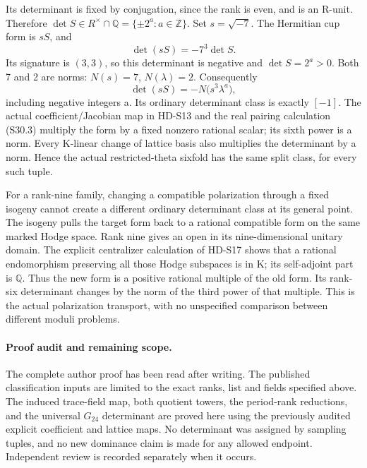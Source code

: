 Its determinant is fixed by conjugation, since the rank is even,
and is an R-unit. Therefore
\(\det S\in R^\times\cap\mathbb Q=\{\pm2^a:a\in\mathbb Z\}\).
Set \(s=\sqrt{-7}\). The Hermitian cup form is \(sS\), and
\[
                    \det(sS)=-7^3\det S.
\]
Its signature is \((3,3)\), so this determinant is negative
and \(\det S=2^a>0\). Both 7 and 2 are norms:
\(N(s)=7\), \(N(\lambda)=2\). Consequently
\[
              \det(sS)=-N\bigl(s^3\lambda^a\bigr),
\]
including negative integers a. Its ordinary determinant class
is exactly \([-1]\). The actual coefficient/Jacobian map in
HD-S13 and the real pairing calculation (S30.3) multiply the form
by a fixed nonzero rational scalar; its sixth power is a norm.
Every K-linear change of lattice basis also multiplies the
determinant by a norm. Hence the actual restricted-theta sixfold
has the same split class, for every such tuple.

For a rank-nine family, changing a compatible polarization through
a fixed isogeny cannot create a different ordinary determinant
class at its general point. The isogeny pulls the target form back
to a rational compatible form on the same marked Hodge space.
Rank nine gives an open in its nine-dimensional unitary domain.
The explicit centralizer calculation of HD-S17 shows that a rational
endomorphism preserving all those Hodge subspaces is in K; its
self-adjoint part is \(\mathbb Q\). Thus the new form is a
positive rational multiple of the old form. Its rank-six determinant
changes by the norm of the third power of that multiple. This is
the actual polarization transport, with no unspecified comparison
between different moduli problems.

\paragraph{Proof audit and remaining scope.}
The complete author proof has been read after writing. The published
classification inputs are limited to the exact ranks, list and fields
specified above. The induced trace-field map, both quotient towers,
the period-rank reductions, and the universal \(G_{24}\) determinant
are proved here using the previously audited explicit coefficient and
lattice maps. No determinant was assigned by sampling tuples, and no
new dominance claim is made for any allowed endpoint. Independent
review is recorded separately when it occurs.
